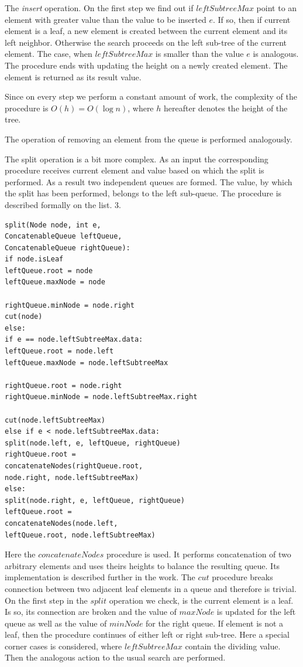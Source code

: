 \documentclass[conference]{IEEEtran}
\theoremstyle{plane}
\begin{document}
The \textit{insert} operation. On the first step we find out if $leftSubtreeMax$ point to an element with greater value than the value to be inserted $e$. If so, then if current element is a leaf, a new element is created between the current element and its left neighbor. Otherwise the search proceeds on the left sub-tree of the current element. The case, when $leftSubtreeMax$ is smaller than the value $e$ is analogous. The procedure ends with updating the height on a newly created element. The element is returned as its result value.

Since on every step we perform a constant amount of work, the complexity of the procedure is $O(h)=O(\log n)$, where $h$ hereafter denotes the height of the tree.

The operation of removing an element from the queue is performed analogously. 

The split operation is a bit more complex. As an input the corresponding procedure receives current element and value based on which the split is performed. As a result two independent queues are formed. The value, by which the split has been performed, belongs to the left sub-queue. The procedure is described formally on the list. 3.

\begin{lstlisting}[caption={Queue plit algorithm},captionpos=b]
split(Node node, int e, 
ConcatenableQueue leftQueue, 
ConcatenableQueue rightQueue): 
if node.isLeaf
leftQueue.root = node
leftQueue.maxNode = node	

rightQueue.minNode = node.right	
cut(node)
else:
if e == node.leftSubtreeMax.data:
leftQueue.root = node.left
leftQueue.maxNode = node.leftSubtreeMax

rightQueue.root = node.right
rightQueue.minNode = node.leftSubtreeMax.right

cut(node.leftSubtreeMax)
else if e < node.leftSubtreeMax.data:
split(node.left, e, leftQueue, rightQueue)
rightQueue.root =
concatenateNodes(rightQueue.root, 
node.right, node.leftSubtreeMax)
else:
split(node.right, e, leftQueue, rightQueue)
leftQueue.root = 
concatenateNodes(node.left, 
leftQueue.root, node.leftSubtreeMax)
\end{lstlisting}

Here the $concatenateNodes$ procedure is used. It performs concatenation of two arbitrary elements and uses theirs heights to balance the resulting queue. Its implementation is described further in the work. The $cut$ procedure breaks connection between two adjacent leaf elements in a queue and therefore is trivial. On the first step in the $split$ operation we check, is the current element is a leaf. Is so, its connection are broken and the value of $maxNode$ is updated for the left queue as well as the value of $minNode$ for the right queue. If element is not a leaf, then the procedure continues of either left or right sub-tree. Here a special corner cases is considered, where $leftSubtreeMax$ contain the dividing value. Then the analogous action to the usual search are performed.
\end{document}
